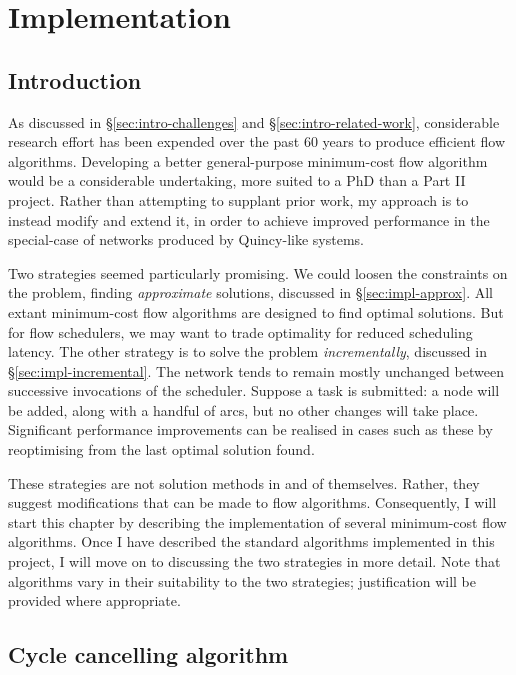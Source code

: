 \chapter{Implementation} \label{chap:impl}

\section{Introduction}

As discussed in \S\ref{sec:intro-challenges} and \S\ref{sec:intro-related-work}, considerable research effort has been expended over the past 60 years to produce efficient flow algorithms. Developing a better general-purpose minimum-cost flow algorithm would be a considerable undertaking, more suited to a PhD than a Part II project. Rather than attempting to supplant prior work, my approach is to instead modify and extend it, in order to achieve improved performance in the special-case of networks produced by Quincy-like systems.

Two strategies seemed particularly promising. We could loosen the constraints on the problem, finding \emph{approximate} solutions, discussed in \S\ref{sec:impl-approx}. All extant minimum-cost flow algorithms are designed to find optimal solutions. But for flow schedulers, we may want to trade optimality for reduced scheduling latency. The other strategy is to solve the problem \emph{incrementally}, discussed in \S\ref{sec:impl-incremental}. The network tends to remain mostly unchanged between successive invocations of the scheduler. Suppose a task is submitted: a node will be added, along with a handful of arcs, but no other changes will take place. Significant performance improvements can be realised in cases such as these by reoptimising from the last optimal solution found.

These strategies are not solution methods in and of themselves. Rather, they suggest modifications that can be made to flow algorithms. Consequently, I will start this chapter by describing the implementation of several minimum-cost flow algorithms. Once I have described the standard algorithms implemented in this project, I will move on to discussing the two strategies in more detail. Note that algorithms vary in their suitability to the two strategies; justification will be provided where appropriate.


\section{Cycle cancelling algorithm}

